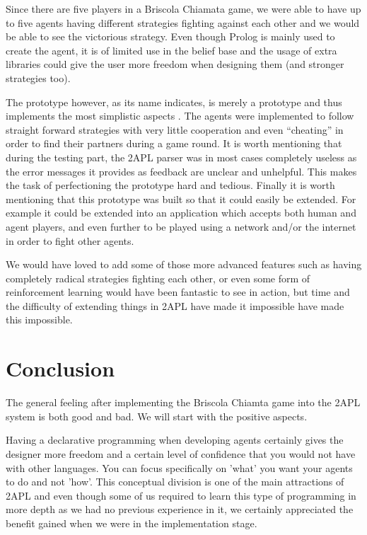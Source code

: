 \documentclass[a4paper]{article}
\begin{document}
Since there are five players in a Briscola Chiamata game, we were able to have up to five agents having different strategies fighting against each other and we would be able to see the victorious strategy. Even though Prolog is mainly used to create the agent, it is of limited use in the belief base and the usage of extra libraries could give the user more freedom when designing them (and  stronger strategies too).

The prototype however, as its name indicates, is merely a prototype and thus implements the most simplistic aspects . The agents were implemented to follow straight forward strategies with very little cooperation and even ``cheating'' in order to find their partners during a game round. It is worth mentioning that during the testing part, the 2APL parser was in most cases completely useless as the error messages it provides as feedback are unclear and unhelpful. This makes the task of perfectioning the prototype hard and tedious. Finally it is worth mentioning that this prototype was built so that it could easily be extended. For example it could be extended into an application which accepts both human and agent players, and even further to be played using a network and/or the internet in order to fight other agents.

We would have loved to add some of those more advanced features such as having completely radical strategies fighting each other, or even some form of reinforcement learning would have been fantastic to see in action, but time and the difficulty of extending things in 2APL have made it impossible have made this impossible.

\section{Conclusion}\label{sec:concl} 

The general feeling after implementing the Briscola Chiamta game into the 2APL system is both good and bad. We will start with the positive aspects.

Having a declarative programming when developing agents certainly gives the designer more freedom and a certain level of confidence that you would not have with other languages. You can focus specifically on 'what' you want your agents to do and not 'how'. This conceptual division is one of the main attractions of 2APL and even though some of us required to learn this type of programming in more depth as we had no previous experience in it, we certainly appreciated the benefit gained when we were in the implementation stage.
\end{document}
